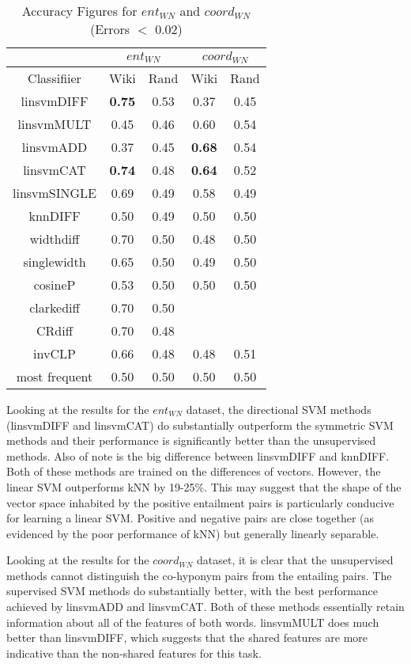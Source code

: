 \documentclass[11pt]{article}
\begin{document}
\begin{table}[ht]
\centering
\begin{tabular}{|c|c|c|c|c|}
\hline
&\multicolumn{2}{|c|}{$ent_{WN}$}&\multicolumn{2}{|c|}{$coord_{WN}$}\\
\hline
Classifiier&Wiki&Rand&Wiki&Rand\\
\hline
linsvmDIFF&\textbf{0.75}&0.53&0.37&0.45\\
linsvmMULT&0.45&0.46&0.60&0.54\\
linsvmADD&0.37&0.45&\textbf{0.68}&0.54\\
linsvmCAT&\textbf{0.74}&0.48&\textbf{0.64}&0.52\\
linsvmSINGLE&0.69&0.49&0.58&0.49\\
knnDIFF&0.50&0.49&0.50&0.50\\
\hline
widthdiff&0.70&0.50&0.48&0.50\\
singlewidth&0.65&0.50&0.49&0.50\\
cosineP&0.53&0.50&0.50&0.50\\
clarkediff&0.70&0.50&&\\
CRdiff&0.70&0.48&&\\
invCLP&0.66&0.48&0.48&0.51\\
most frequent&0.50&0.50&0.50&0.50\\
\hline
\end{tabular}
\caption{Accuracy Figures for $ent_{WN}$ and $coord_{WN}$ (Errors $<$ 0.02)}
\label{table:results_WN}
\end{table}

Looking at the results for the $ent_{WN}$ dataset, the directional SVM methods (linsvmDIFF and linsvmCAT) do substantially outperform the symmetric SVM methods and their performance is significantly better than the unsupervised methods.  Also of note is the big difference between linsvmDIFF and knnDIFF.  Both of these methods are trained on the differences of vectors.  However, the linear SVM outperforms kNN by 19-25\%.  This may suggest that the shape of the vector space inhabited by the positive entailment pairs is particularly conducive for learning a linear SVM.  Positive and negative pairs are close together (as evidenced by the poor performance of kNN) but generally linearly separable.

Looking at the results for the $coord_{WN}$ dataset, it is clear that the unsupervised methods cannot distinguish the co-hyponym pairs from the entailing pairs.  The supervised SVM methods do substantially better, with the best performance achieved by linsvmADD and linsvmCAT.  Both of these methods essentially retain information about all of the features of both words.  linsvmMULT does much better than linsvmDIFF, which suggests that the shared features are more indicative than the non-shared features for this task. 
\end{document}
